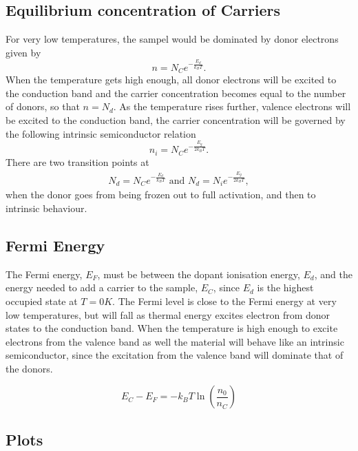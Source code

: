 \documentclass[11pt]{amsart}
\begin{document}
\subsection{Equilibrium concentration of Carriers}
For very low temperatures, the sampel would be dominated by donor electrons given by
\begin{equation}
n = N_C e^{-\frac{E_d}{k_B T}}.
\end{equation}
When the temperature gets high enough, all donor electrons will be excited to the conduction band and the carrier concentration becomes equal to the number of donors, so that $n=N_d$. As the temperature rises further, valence electrons will be excited to the conduction band, the carrier concentration will be governed by the following intrinsic semiconductor relation
\begin{equation}
n_i = N_C e^{-\frac{E_g}{2k_BT}}.
\end{equation}
There are two transition points at
\begin{align*}
N_d = N_Ce^{-\frac{E_d}{k_BT}} \text{ and } N_d = N_ie^{-\frac{E_g}{2k_BT}},
\end{align*}
when the donor goes from being frozen out to full activation, and then to intrinsic behaviour.

\subsection{Fermi Energy}
The Fermi energy, $E_F$, must be between the dopant ionisation energy, $E_d$, and the energy needed to add a carrier to the sample, $E_C$, since $E_d$ is the highest occupied state at $T = 0K$. The Fermi level is close to the Fermi energy at very low temperatures, but will fall as thermal energy excites electron from donor states to the conduction band. When the temperature is high enough to excite electrons from the valence band as well the material will behave like an intrinsic semiconductor, since the excitation from the valence band will dominate that of the donors.

\begin{equation}
E_C - E_F = -k_BT\ln\left(\frac{n_0}{n_C}\right)
\end{equation}

\subsection{Plots}
\end{document}
